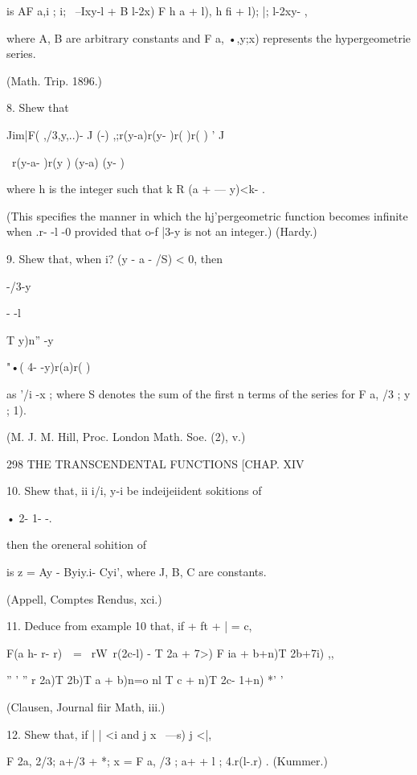 is AF a,i ; i; \ --Ixy-l + B l-2x) F h a + l), h fi + l); |; l-2xy- ,

where A, B are arbitrary constants and F a, •,y;x) represents the
hypergeometrie series.

(Math. Trip. 1896.)

8. Shew that

Jim|F( ,/3,y,..)- J (-) ,;r(y-a)r(y- )r( )r( ) ' J

\ r(y-a- )r(y ) (y-a) (y- )

where h is the integer such that k R (a + — y)<k- .

(This specifies the manner in which the hj'pergeometric function
becomes infinite when .r- -l -0 provided that o-f |3-y is not an
integer.) (Hardy.)



9. Shew that, when i? (y - a - /S) < 0, then

-/3-y

- -l



T y)n'' -y



 "•( 4- -y)r(a)r( )

as '/i -x ; where S denotes the sum of the first n terms of the series
for F a, /3 ; y ; 1).

(M. J. M. Hill, Proc. London Math. Soe. (2), v.)



298 THE TRANSCENDENTAL FUNCTIONS [CHAP. XIV

10. Shew that, ii i/i, y-i be indeijeiident sokitions of



• 2- 1- -.



then the oreneral sohition of



is z = Ay - Byiy.i- Cyi', where J, B, C are constants.

(Appell, Comptes Rendus, xci.)

11. Deduce from example 10 that, if + ft + | = c,

 F(a h- r- r)\ \ = \ rW\ r(2c-l) - T 2a + 7>) F ia + b+n)T 2b+7i) ,,

'' ' '' r 2a)T 2b)T a + b)n=o nl T c + n)T 2c- 1+n) *' '

(Clausen, Journal fiir Math, iii.)

12. Shew that, if | | <i and j x \ —s) j <|,

F 2a, 2/3; a+/3 + *; x = F a, /3 ; a+ + l ; 4.r(l-.r) . (Kummer.)

